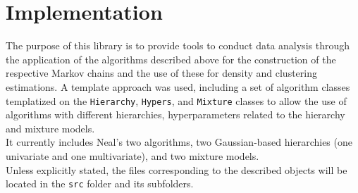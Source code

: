 \chapter{Implementation}
The purpose of this library is to provide tools to conduct data analysis through the application of the algorithms described above for the construction of the respective Markov chains and the use of these for density and clustering estimations.
A template approach was used, including a set of algorithm classes templatized on the \verb|Hierarchy|, \verb|Hypers|, and \verb|Mixture| classes to allow the use of algorithms with different hierarchies, hyperparameters related to the hierarchy and mixture models. \\
It currently includes Neal's two algorithms, two Gaussian-based hierarchies (one univariate and one multivariate), and two mixture models. \\
Unless explicitly stated, the files corresponding to the described objects will be located in the \verb|src| folder and its subfolders.


